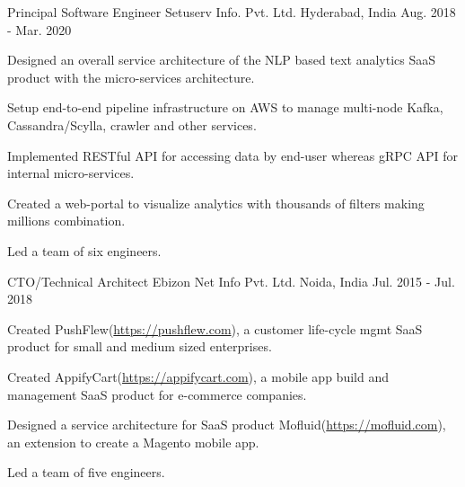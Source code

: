 

\begin{cventries}

  \cventry
    {Principal Software Engineer} %
    {Setuserv Info. Pvt. Ltd.} %
    {Hyderabad, India} %
    {Aug. 2018 - Mar. 2020} %
    {
      \begin{cvitems} %
        \item {Designed an overall service architecture of the NLP based text analytics SaaS product with the micro-services architecture.}
        \item {Setup end-to-end pipeline infrastructure on AWS to manage multi-node Kafka, Cassandra/Scylla, crawler and other services.}
        \item {Implemented RESTful API for accessing data by end-user whereas gRPC API for internal micro-services.} 
        \item {Created a web-portal to visualize analytics with thousands of filters making millions combination.}
        \item {Led a team of six engineers.}
      \end{cvitems}
    }

  \cventry
    {CTO/Technical Architect} %
    {Ebizon Net Info Pvt. Ltd.} %
    {Noida, India} %
    {Jul. 2015 - Jul. 2018} %
    {
      \begin{cvitems} %
        \item {Created PushFlew(\href{https://pushflew.com}{https://pushflew.com}), a customer life-cycle mgmt SaaS product for small and medium sized enterprises.}
        \item {Created AppifyCart(\href{https://appifycart.com}{https://appifycart.com}), a mobile app build and management SaaS product for e-commerce companies.}
        \item {Designed a service architecture for SaaS product Mofluid(\href{https://mofluid.com}{https://mofluid.com}), an extension to create a Magento mobile app.}
        \item {Led a team of five engineers.}
      \end{cvitems}
    }


\end{cventries}
